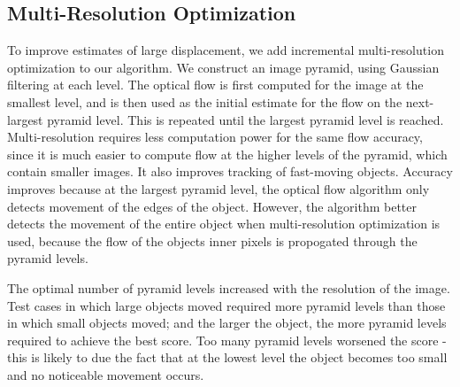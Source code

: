 \documentclass[10pt,twocolumn,letterpaper]{article}
\begin{document}
\subsection{Multi-Resolution Optimization}
To improve estimates of large displacement, we add incremental multi-resolution optimization to our algorithm.  We construct an image pyramid, using Gaussian filtering at each level. The optical flow is first computed for the image at the smallest level, and is then used as the initial estimate for the flow on the next-largest pyramid level.  This is repeated until the largest pyramid level is reached. Multi-resolution requires less computation power for the same flow accuracy, since it is much easier to compute flow at the higher levels of the pyramid, which contain smaller images.  It also improves tracking of fast-moving objects.  Accuracy improves because at the largest pyramid level, the optical flow algorithm only detects movement of the edges of the object. However, the algorithm better detects the movement of the entire object when multi-resolution optimization is used, because the flow of the objects inner pixels is propogated through the pyramid levels.

The optimal number of pyramid levels increased with the resolution of the image. Test cases in which large objects moved required more pyramid levels than those in which small objects moved; and the larger the object, the more pyramid levels required to achieve the best score. Too many pyramid levels worsened the score - this is likely to due the fact that at the lowest level the object becomes too small and no noticeable movement occurs.
\end{document}
